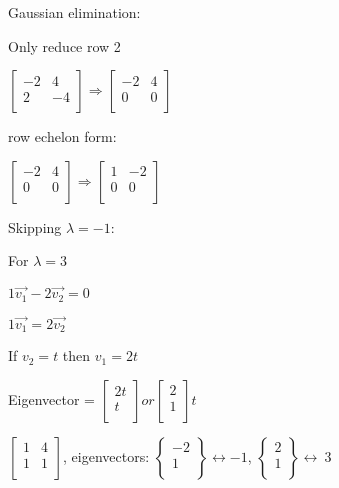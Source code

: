 \documentclass{extarticle}
\begin{document}
\begin{multicols}{2}
Gaussian elimination:

Only reduce row 2

$\left[\begin{matrix}-2&4\\2&-4\\\end{matrix}\right]\Rightarrow\left[\begin{matrix}-2&4\\0&0\\\end{matrix}\right]$

row echelon form:

$\left[\begin{matrix}-2&4\\0&0\\\end{matrix}\right]\Rightarrow\left[\begin{matrix}1&-2\\0&0\\\end{matrix}\right]$

Skipping $\lambda=-1$:

For $\lambda=3$

$1\vec{v_1}-2\vec{v_2}=0$

$1\vec{v_1}=2\vec{v_2}$

If $v_2=t$ then $v_1=2t$

Eigenvector = $\left[\begin{matrix}2t\\t\\\end{matrix}\right] or \left[\begin{matrix}2\\1\\\end{matrix}\right]t$



$\left[\begin{matrix}1&4\\1&1\\\end{matrix}\right]$, eigenvectors: $\left\{\begin{matrix}-2\\1\\\end{matrix}\right\}\leftrightarrow-1$, $\left\{\begin{matrix}2\\1\\\end{matrix}\right\}\leftrightarrow\ 3$


\end{multicols}
\end{document}
